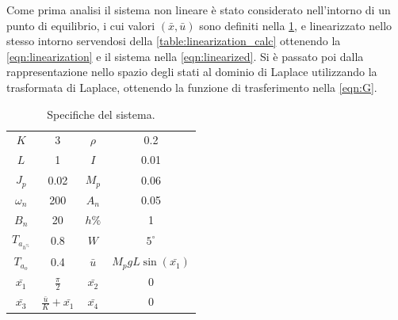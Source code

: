 \documentclass[a4paper]{article}
\begin{document}
Come prima analisi il sistema non lineare è stato considerato nell’intorno di un punto di equilibrio, i cui valori $(\bar{x}, \bar{u})$ sono definiti nella \cref{table:ref_val}, e linearizzato nello stesso intorno servendosi della \cref{table:linearization_calc} ottenendo la \cref{eqn:linearization} e il sistema nella \cref{eqn:linearized}.
Si è passato poi dalla rappresentazione nello spazio degli stati al dominio di Laplace utilizzando la trasformata di Laplace, ottenendo la funzione di trasferimento nella \cref{eqn:G}.

{\begin{table}[h!]

    \centering

    \begin{tabular}{| c | c || c | c |}

        $K$ & 3 &
        $\rho$ & 0.2 \\
        $L$ & 1 &
        $I$ & 0.01 \\
        $J_p$ & 0.02 &
        $M_p$ & 0.06 \\
        $\omega_n$ & 200 &
        $A_n$ & 0.05 \\
        $B_n$ & 20 &
        $h\%$ & 1 \\
        $T_{a_{h^\%}}$ & 0.8 &
        $W$ & $5^\circ$ \\
        $T_{a_o}$ & 0.4 &
        $\bar{u}$  & $M_p g L \sin(\bar{x_1})$ \\
        $\bar{x_1}$  & $\frac{\pi}{2}$ &
        $\bar{x_2}$  & 0 \\
        $\bar{x_3}$  &$\frac{\bar{u}}{K} + \bar{x_1}$ &
        $\bar{x_4}$  & 0


    \end{tabular}
    \caption{Specifiche del sistema.}
        \label{table:ref_val}
\end{table}
}
\end{document}
